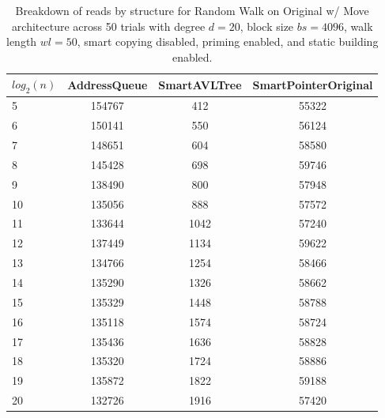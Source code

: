 \begin{table}[]
\centering
\begin{tabular}{|l|c|c|c|}
$log_2(n)$ & AddressQueue & SmartAVLTree & SmartPointerOriginal \\ \hline
5 & 154767 & 412 & 55322 \\ \hline
6 & 150141 & 550 & 56124 \\ \hline
7 & 148651 & 604 & 58580 \\ \hline
8 & 145428 & 698 & 59746 \\ \hline
9 & 138490 & 800 & 57948 \\ \hline
10 & 135056 & 888 & 57572 \\ \hline
11 & 133644 & 1042 & 57240 \\ \hline
12 & 137449 & 1134 & 59622 \\ \hline
13 & 134766 & 1254 & 58466 \\ \hline
14 & 135290 & 1326 & 58662 \\ \hline
15 & 135329 & 1448 & 58788 \\ \hline
16 & 135118 & 1574 & 58724 \\ \hline
17 & 135436 & 1636 & 58828 \\ \hline
18 & 135320 & 1724 & 58886 \\ \hline
19 & 135872 & 1822 & 59188 \\ \hline
20 & 132726 & 1916 & 57420 \\ \hline
\end{tabular}
\caption{Breakdown of reads by structure for Random Walk on Original w/ Move architecture across 50 trials with degree $d=20$, block size $bs=4096$, walk length $wl=50$, smart copying disabled, priming enabled, and static building enabled.}
    \label{tab:reads_by_structure_rw_d20_bs4096_trials50_copiesfalse_primetrue_staticinsertiontrue_wl50_ptoriginal_movetrue}
\end{table}

